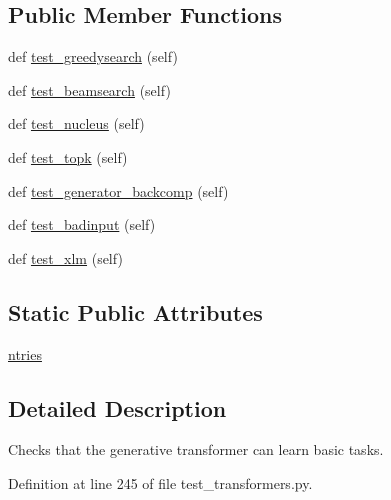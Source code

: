 \subsection*{Public Member Functions}
\begin{DoxyCompactItemize}
\item 
def \hyperlink{classtests_1_1test__transformers_1_1TestTransformerGenerator_a46ea25442100b52add258989e9aa9860}{test\+\_\+greedysearch} (self)
\item 
def \hyperlink{classtests_1_1test__transformers_1_1TestTransformerGenerator_af16ba00a7a4c07df6bed84c8aad2635c}{test\+\_\+beamsearch} (self)
\item 
def \hyperlink{classtests_1_1test__transformers_1_1TestTransformerGenerator_ab1e05d5384de2fcd880f515108de9b4a}{test\+\_\+nucleus} (self)
\item 
def \hyperlink{classtests_1_1test__transformers_1_1TestTransformerGenerator_a571dff6d213773d3590419d84f0b088f}{test\+\_\+topk} (self)
\item 
def \hyperlink{classtests_1_1test__transformers_1_1TestTransformerGenerator_a5eb4d78c39c3b525e3254789c2101072}{test\+\_\+generator\+\_\+backcomp} (self)
\item 
def \hyperlink{classtests_1_1test__transformers_1_1TestTransformerGenerator_a6a21a74b697b8918bc38625e443e24d1}{test\+\_\+badinput} (self)
\item 
def \hyperlink{classtests_1_1test__transformers_1_1TestTransformerGenerator_a42e386425e0e497ccb97a73409192990}{test\+\_\+xlm} (self)
\end{DoxyCompactItemize}
\subsection*{Static Public Attributes}
\begin{DoxyCompactItemize}
\item 
\hyperlink{classtests_1_1test__transformers_1_1TestTransformerGenerator_a1555f81fb11a5497f644e99607c3d17d}{ntries}
\end{DoxyCompactItemize}


\subsection{Detailed Description}
\begin{DoxyVerb}Checks that the generative transformer can learn basic tasks.\end{DoxyVerb}
 

Definition at line 245 of file test\+\_\+transformers.\+py.



